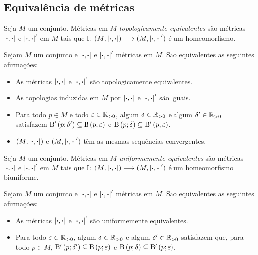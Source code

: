 \subsection{Equivalência de métricas}

\begin{definition}
Seja $M$ um conjunto. Métricas em $M$ \emph{topologicamente equivalentes} são métricas $\dist{\var}{\var}$ e $\dist{\var}{\var}'$ em $M$ tais que $\fun{\Id}{(M,\dist{\var}{\var})}{(M,\dist{\var}{\var}')}$ é um homeomorfismo.
\end{definition}

\begin{proposition}
Sejam $M$ um conjunto e $\dist{\var}{\var}$ e $\dist{\var}{\var}'$ métricas em $M$. São equivalentes as seguintes afirmações:
	\begin{itemize}
	\item As métricas $\dist{\var}{\var}$ e $\dist{\var}{\var}'$ são topologicamente equivalentes.
	\item As topologias induzidas em $M$ por $\dist{\var}{\var}$ e $\dist{\var}{\var}'$ são iguais.
	\item Para todo $p \in M$ e todo $\varepsilon \in \R_{>0}$, algum $\delta \in \R_{>0}$ e algum $\delta' \in \R_{>0}$ satisfazem $\bola[']{p}{\delta'} \subseteq \bola{p}{\varepsilon}$ e $\bola{p}{\delta} \subseteq \bola[']{p}{\varepsilon}$.
	\item $(M,\dist{\var}{\var})$ e $(M,\dist{\var}{\var}')$ têm as mesmas sequências convergentes.
	\end{itemize}
\end{proposition}

\begin{definition}
Seja $M$ um conjunto. Métricas em $M$ \emph{uniformemente equivalentes} são métricas $\dist{\var}{\var}$ e $\dist{\var}{\var}'$ em $M$ tais que $\fun{\Id}{(M,\dist{\var}{\var})}{(M,\dist{\var}{\var}')}$ é um homeomorfismo biuniforme.
\end{definition}

\begin{proposition}
Sejam $M$ um conjunto e $\dist{\var}{\var}$ e $\dist{\var}{\var}'$ métricas em $M$. São equivalentes as seguintes afirmações:
	\begin{itemize}
	\item As métricas $\dist{\var}{\var}$ e $\dist{\var}{\var}'$ são uniformemente equivalentes.
	\item Para todo $\varepsilon \in \R_{>0}$, algum $\delta \in \R_{>0}$ e algum $\delta' \in \R_{>0}$ satisfazem que, para todo $p \in M$, $\bola[']{p}{\delta'} \subseteq \bola{p}{\varepsilon}$ e $\bola{p}{\delta} \subseteq \bola[']{p}{\varepsilon}$.
	\end{itemize}
\end{proposition}

